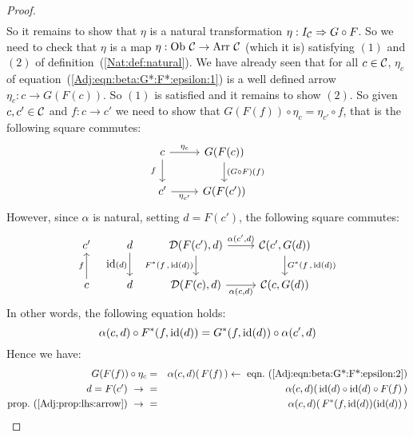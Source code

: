 \begin{proof}
\begin{eqnarray*}
        \end{eqnarray*}
    So it remains to show that $\eta$ is a natural transformation 
    $\eta:I_{\cal C}\Rightarrow G\circ F$. So we need to check that 
    $\eta$ is a map $\eta:\mbox{\rm Ob}\ \mbox{$\cal C$}\to\mbox{\rm Arr}\ \mbox{$\cal C$}$ (which it is) satisfying
    $(1)$ and $(2)$ of definition~(\ref{Nat:def:natural}). We have already
    seen that for all $c\in\mbox{$\cal C$}$, $\eta_{c}$ of
    equation~(\ref{Adj:eqn:beta:G*:F*:epsilon:1}) is a well defined arrow
    $\eta_{c}:c\to G(F(c))$. So $(1)$ is satisfied and it remains to show $(2)$.
    So given $c,c'\in\mbox{$\cal C$}$ and $f:c\to c'$ we need to show that
    $G(F(f))\circ\eta_{c}=\eta_{c'}\circ f$, that is the following 
    square commutes:
        \[
            \begin{tikzcd}
                c\arrow[r, "\eta_{c}"]\arrow[d, swap,"f\ "]
                &G(F(c))\arrow[d, "(G\circ F)(f)"]
                \\
                c'\arrow[r, swap, "\eta_{c'}"]
                &G(F(c'))
            \end{tikzcd}
        \]
    However, since $\alpha$ is natural, setting $d=F(c')$, the following
    square commutes:
        \[
            \begin{tikzcd}
                c'
                &d\arrow[d,swap, "\id(d)"]
                &\Dat(F(c'),d)\arrow[r, "\alpha\mbox{$(c',d)$}"]
                \arrow[d, swap,"F^{*}\mbox{$(f\,,\,{\rm id}(d))$}"]
                &\Cat(c',G(d))
                \arrow[d, "G^{*}\mbox{$(f\,,\,{\rm id}(d))$}"]
                \\
                c\arrow[u, "f"]
                &d
                &\Dat(F(c),d)\arrow[r, swap, "\alpha\mbox{$(c,d)$}"]
                &\Cat(c,G(d))
            \end{tikzcd}
        \]
    In other words, the following equation holds:
        \begin{equation}\label{Adj:eqn:beta:G*:F*:epsilon:4}
            \alpha(c,d)\circ F^{*}(f,\mbox{\rm id}(d)) = G^{*}(f,\mbox{\rm id}(d))\circ\alpha(c',d)
        \end{equation}
    Hence we have: 
        \begin{eqnarray*}G(F(f))\circ\eta_{c}
            &=&\alpha(c,d)(\,F(f)\,)
            \leftarrow\ \mbox{eqn.~(\ref{Adj:eqn:beta:G*:F*:epsilon:2})}\\
            \mbox{$d=F(c')$}\ \to\ 
            &=&\alpha(c,d)(\,\id(d)\circ\id(d)\circ F(f)\,)\\
            \mbox{prop.~(\ref{Adj:prop:lhs:arrow})}\ \to\ 
            &=&\alpha(c,d)(\,F^{*}(f,\id(d))(\id(d))\,)\\

\end{eqnarray*}
\end{proof}
